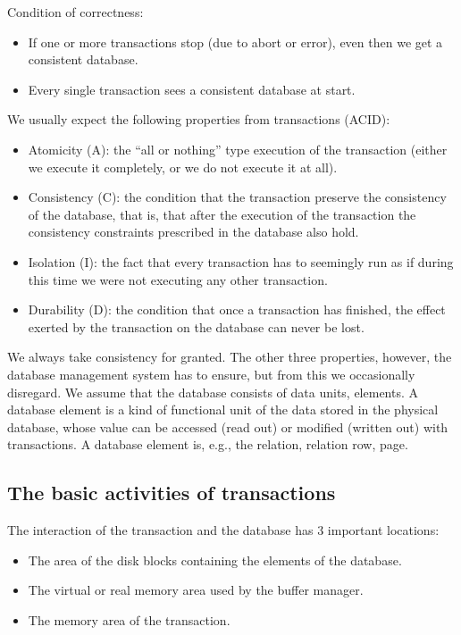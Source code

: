 \documentclass[margin=0px]{article}
\begin{document}
\noindent Condition of correctness:
\begin{itemize}
    \item	If one or more transactions stop (due to abort or error), even then we get a consistent database.
    \item	Every single transaction sees a consistent database at start.
\end{itemize}

\noindent We usually expect the following properties from transactions (ACID):

\begin{itemize}
    \item	Atomicity (A): the ``all or nothing'' type execution of the transaction (either we execute it completely, or we do not execute it at all).

    \item	Consistency (C): the condition that the transaction preserve the consistency of the database, that is, that after the execution of the transaction the consistency constraints prescribed in the database also hold.

    \item	Isolation (I): the fact that every transaction has to seemingly run as if during this time we were not executing any other transaction.

    \item	Durability (D): the condition that once a transaction has finished, the effect exerted by the transaction on the database can never be lost.
\end{itemize}
We always take consistency for granted. The other three properties, however, the database management system has to ensure, but from this we occasionally disregard. We assume that the database consists of data units, elements. A database element is a kind of functional unit of the data stored in the physical database, whose value can be accessed (read out) or modified (written out) with transactions. A database element is, e.g., the relation, relation row, page.\\

\subsection{The basic activities of transactions}

\noindent The interaction of the transaction and the database has 3 important locations:
\begin{itemize}
    \item	The area of the disk blocks containing the elements of the database.
    \item	The virtual or real memory area used by the buffer manager.
    \item	The memory area of the transaction.
\end{itemize}
\end{document}
